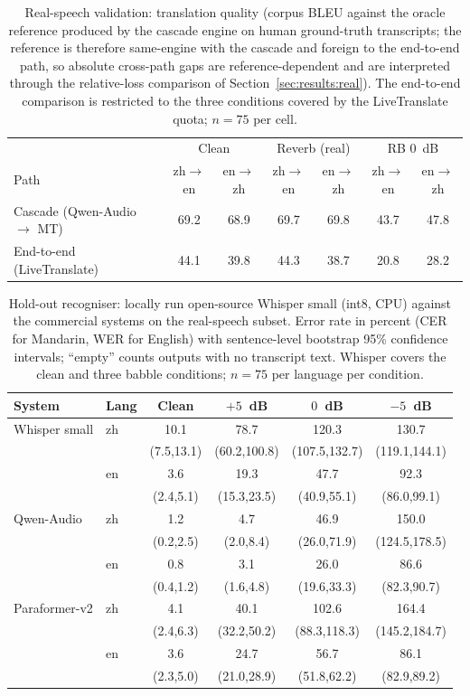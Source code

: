 \begin{table}[t]
\centering
\caption{Real-speech validation: translation quality (corpus BLEU against
the oracle reference produced by the cascade engine on human
ground-truth transcripts; the reference is therefore same-engine with the
cascade and foreign to the end-to-end path, so absolute cross-path gaps
are reference-dependent and are interpreted through the relative-loss
comparison of Section~\ref{sec:results:real}). The end-to-end comparison
is restricted to the three conditions covered by the LiveTranslate quota;
$n = 75$ per cell.}
\label{tab:realval_mt}
\small
\begin{tabular}{lcccccc}
\toprule
 & \multicolumn{2}{c}{Clean} & \multicolumn{2}{c}{Reverb (real)} & \multicolumn{2}{c}{RB $0$~dB} \\
Path & zh$\to$en & en$\to$zh & zh$\to$en & en$\to$zh & zh$\to$en & en$\to$zh \\
\midrule
Cascade (Qwen-Audio $\to$ MT) & 69.2 & 68.9 & 69.7 & 69.8 & 43.7 & 47.8 \\
End-to-end (LiveTranslate) & 44.1 & 39.8 & 44.3 & 38.7 & 20.8 & 28.2 \\
\bottomrule
\end{tabular}
\end{table}

\begin{table}[t]
\centering
\caption{Hold-out recogniser: locally run open-source Whisper small (int8,
CPU) against the commercial systems on the real-speech subset. Error rate
in percent (CER for Mandarin, WER for English) with sentence-level
bootstrap 95\% confidence intervals; ``empty'' counts outputs with no
transcript text. Whisper covers the clean and three babble conditions;
$n = 75$ per language per condition.}
\label{tab:holdout_asr}
\footnotesize
\setlength{\tabcolsep}{2.6pt}
\begin{tabular}{llcccc}
\toprule
System & Lang & Clean & $+5$~dB & $0$~dB & $-5$~dB \\
\midrule
Whisper small & zh & 10.1 & 78.7 & 120.3 & 130.7 \\
 &  & (7.5,13.1) & (60.2,100.8) & (107.5,132.7) & (119.1,144.1) \\
 & en & 3.6 & 19.3 & 47.7 & 92.3 \\
 &  & (2.4,5.1) & (15.3,23.5) & (40.9,55.1) & (86.0,99.1) \\
Qwen-Audio & zh & 1.2 & 4.7 & 46.9 & 150.0 \\
 &  & (0.2,2.5) & (2.0,8.4) & (26.0,71.9) & (124.5,178.5) \\
 & en & 0.8 & 3.1 & 26.0 & 86.6 \\
 &  & (0.4,1.2) & (1.6,4.8) & (19.6,33.3) & (82.3,90.7) \\
Paraformer-v2 & zh & 4.1 & 40.1 & 102.6 & 164.4 \\
 &  & (2.4,6.3) & (32.2,50.2) & (88.3,118.3) & (145.2,184.7) \\
 & en & 3.6 & 24.7 & 56.7 & 86.1 \\
 &  & (2.3,5.0) & (21.0,28.9) & (51.8,62.2) & (82.9,89.2) \\
\bottomrule
\end{tabular}
\end{table}


